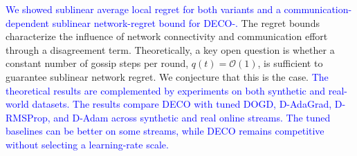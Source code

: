 \documentclass[journal]{IEEEtran}
\newcommand{\algname}{{DECO}\xspace}
\begin{document}
\textcolor{blue}{We showed sublinear average local regret for both variants and a communication-dependent sublinear network-regret bound for \algname{}-.}
The regret bounds characterize the influence of network connectivity and communication effort through a disagreement term.
Theoretically, a key open question is whether a constant number of gossip steps per round, $q(t)=\mathcal{O}(1)$, is sufficient to guarantee sublinear network regret.
We conjecture that this is the case.
\textcolor{blue}{The theoretical results are complemented by experiments on both synthetic and real-world datasets.}
\textcolor{blue}{The results compare \algname{} with tuned DOGD, D-AdaGrad, D-RMSProp, and D-Adam across synthetic and real online streams. The tuned baselines can be better on some streams, while \algname{} remains competitive without selecting a learning-rate scale.}



\end{document}

